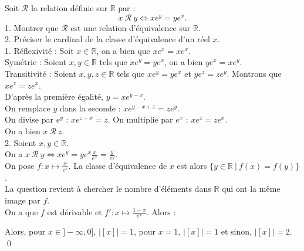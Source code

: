 \documentclass[10pt]{article}
\begin{document}
\begin{tcolorbox}[enhanced, width=7.6in, center, size=fbox, fontupper=\large, drop shadow southwest]
    Soit $\mathcal{R}$ la relation définie sur $\mathbb{R}$ par :
    \begin{equation*}
        x ~\mathcal{R} ~ y \iff xe^y = ye^x.
    \end{equation*}
    1. Montrer que $\mathcal{R}$ est une relation d'équivalence sur $\mathbb{R}$.\\
    2. Préciser le cardinal de la classe d'équivalence d'un réel $x$.\\[0.1cm]
    1. Réflexivité : Soit $x\in\mathbb{R}$, on a bien que $xe^x = xe^x$.\\
    Symétrie : Soient $x,y\in\mathbb{R}$ tels que $xe^y = ye^x$, on a bien $ye^x = xe^y$.\\
    Transitivité : Soient $x,y,z\in\mathbb{R}$ tels que $xe^y = ye^x$ et $ye^z = ze^y$. Montrons que $xe^z = ze^x$.\\
    D'après la première égalité, $y=xe^{y-x}$.\\
    On remplace $y$ dans la seconde : $xe^{y-x+z}=ze^y$.\\
    On divise par $e^y$ : $xe^{z-x}=z$. On multiplie par $e^x$ : $xe^z = ze^x$.\\
    On a bien $x ~ \mathcal{R} ~ z$.\\[0.2cm]
    2. Soient $x,y\in\mathbb{R}$.\\
    On a $x ~ \mathcal{R} ~ y \iff xe^y = ye^x \frac{x}{e^x} = \frac{y}{e^y}$.\\
    On pose $f:x\mapsto \frac{x}{e^x}$. La classe d'équivalence de $x$ est alors $\{y\in\mathbb{R} ~ | ~ f(x) = f(y)\}$.\\
    La question revient à chercher le nombre d'éléments dans $\mathbb{R}$ qui ont la même image par $f$.\\
    On a que $f$ est dérivable et $f':x\mapsto \frac{1-x}{e^{x}}$. Alors :
    \begin{center}
    \end{center}
    Alors, pour $x\in]-\infty,0]$, $|[x]|=1$, pour $x=1$, $|[x]|=1$ et sinon, $|[x]|=2$.\\
    \qed
\end{tcolorbox}
\end{document}
